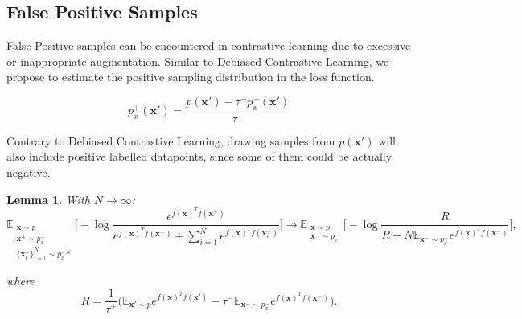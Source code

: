 \documentclass{article}
\begin{document}
\subsection{False Positive Samples} \label{FP}
False Positive samples can be encountered in contrastive learning due to excessive or inappropriate augmentation. Similar to Debiased Contrastive Learning, we propose to estimate the positive sampling distribution in the loss function.

\begin{equation}  \label{eq:8}
p_x^+ (\textbf{x}') = \frac{p(\textbf{x}') - \tau^- p^-_x(\textbf{x}')}{\tau^+}
\end{equation}

Contrary to Debiased Contrastive Learning, drawing samples from $p(\textbf{x}')$ will also include positive labelled datapoints, since some of them could be actually negative. 

\newtheorem{theorem}{Theorem}
\newtheorem{corollary}{Corollary}[theorem]
\newtheorem{lemma}[theorem]{Lemma}

\begin{lemma}
With $N \to \infty$:
\begin{equation} \label{eq:9}
\mathbb{E}_{\substack{\textbf{x} \sim p \\ \textbf{x}^+ \sim p_x^+ \\ \{\textbf{x}_i^-\}_{i=1}^N \sim {p_x^-}^N}} \bigg[ - \log \frac{e^{f(\textbf{x})^T f(\textbf{x}^+)}}{e^{f(\textbf{x})^T f(\textbf{x}^+)} + \sum_{i=1}^N e^{f(\textbf{x})^T f(\textbf{x}_i^-)}} \bigg] \longrightarrow
\mathbb{E}_{\substack{\textbf{x} \sim p \\ \textbf{x}^- \sim p_x^-}} \bigg[ - \log \frac{R}{R + N \mathbb{E}_{\textbf{x}^- \sim p_x^-} e^{f(\textbf{x})^T f(\textbf{x}^-)}} \bigg],
\end{equation}

where
\begin{equation}  \label{eq:10}
R = \frac{1}{\tau^+} \big(\mathbb{E}_{\textbf{x}' \sim p} e^{f(\textbf{x})^T f(\textbf{x}')} - \tau^- \mathbb{E}_{\textbf{x}^- \sim p_x^-} e^{f(\textbf{x})^T f(\textbf{x}^-)}\big).
\end{equation}
\end{lemma}
\end{document}
